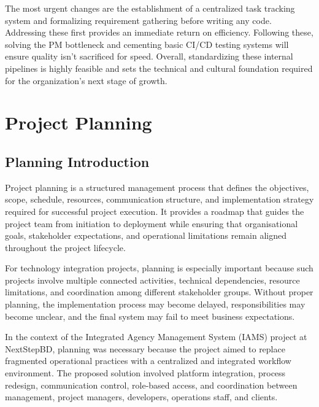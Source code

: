 \documentclass[12pt,a4paper]{report}
\begin{document}
The most urgent changes are the establishment of a centralized task tracking system and formalizing requirement gathering before writing any code. Addressing these first provides an immediate return on efficiency. Following these, solving the PM bottleneck and cementing basic CI/CD testing systems will ensure quality isn't sacrificed for speed. Overall, standardizing these internal pipelines is highly feasible and sets the technical and cultural foundation required for the organization's next stage of growth.

\newpage

\chapter{Project Planning}

\section{Planning Introduction}

Project planning is a structured management process that defines the objectives, scope, schedule, resources, communication structure, and implementation strategy required for successful project execution. It provides a roadmap that guides the project team from initiation to deployment while ensuring that organisational goals, stakeholder expectations, and operational limitations remain aligned throughout the project lifecycle.

For technology integration projects, planning is especially important because such projects involve multiple connected activities, technical dependencies, resource limitations, and coordination among different stakeholder groups. Without proper planning, the implementation process may become delayed, responsibilities may become unclear, and the final system may fail to meet business expectations.

In the context of the Integrated Agency Management System (IAMS) project at NextStepBD, planning was necessary because the project aimed to replace fragmented operational practices with a centralized and integrated workflow environment. The proposed solution involved platform integration, process redesign, communication control, role-based access, and coordination between management, project managers, developers, operations staff, and clients.
\end{document}
